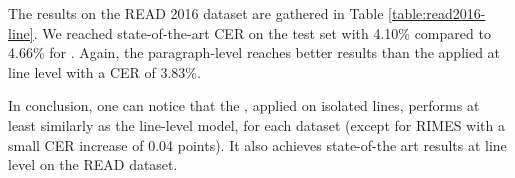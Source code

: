 The results on the READ 2016 dataset are gathered in Table \ref{table:read2016-line}. We reached state-of-the-art CER on the test set with 4.10\% compared to 4.66\% for \cite{Michael2019}. Again, the paragraph-level \modelacc{} reaches better results than the \modelacc{} applied at line level with a CER of 3.83\%.

\begin{table}[!h]
    \caption{Comparison with the state-of-the-art line-level recognizers on READ 2016 dataset.}
    \centering
    \label{table:read2016-line}
\end{table}


In conclusion, one can notice that the \modelacc{}, applied on isolated lines, performs at least similarly as the line-level model, for each dataset (except for RIMES with a small CER increase of 0.04 points). It also achieves state-of-the art results at line level on the READ dataset. 

